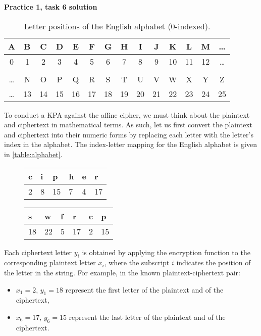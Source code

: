 \documentclass{practice}
\begin{document}
\begin{center}
  \textbf{Practice 1, task 6 solution}
\end{center}

\begin{table}[h!]
  \centering
  \begin{tabular}{@{}cccccccccccccc@{}}
    A  & B  & C  & D  & E  & F  & G  & H  & I  & J  & K  & L  & M & \dots\\\midrule
    0  & 1  & 2  & 3  & 4  & 5  & 6  & 7  & 8  & 9  & 10 & 11 & 12 & \dots\\\\
    \dots & N  & O  & P  & Q  & R  & S  & T  & U  & V  & W  & X  & Y  & Z\\\midrule
    \dots & 13 & 14 & 15 & 16 & 17 & 18 & 19 & 20 & 21 & 22 & 23 & 24 & 25
  \end{tabular}
  \caption{Letter positions of the English alphabet (0-indexed).}
  \label{table:alphabet}
\end{table}

To conduct a KPA against the affine cipher, we must think about the plaintext and ciphertext in mathematical terms.
As such, let us first convert the plaintext and ciphertext into their numeric forms by replacing each letter with the letter's index in the alphabet.
The index-letter mapping for the English alphabet is given in \autoref{table:alphabet}.

\begin{figure}[h!]
  \centering
  \begin{tabular}{@{}C{1em}C{1em}C{1em}C{1em}C{1em}C{1em}@{}}
    c & i & p & h & e & r\\ & 8 & 15 & 7 & 4 & 17
  \end{tabular}
  \hspace*{1cm}
  \begin{tabular}{@{}C{1em}C{1em}C{1em}C{1em}C{1em}C{1em}@{}}
    s & w & f & r & c & p\\ & 22 & 5 & 17 & 2 & 15
  \end{tabular}
\end{figure}

Each ciphertext letter $y_i$ is obtained by applying the encryption function to the corresponding plaintext letter $x_i$, where the subscript $i$ indicates the position of the letter in the string.
For example, in the known plaintext-ciphertext pair:
\begin{itemize}
  \item $x_1 = 2$, $y_1 = 18$ represent the first letter of the plaintext and of the ciphertext,
  \item $x_6 = 17$, $y_6 = 15$ represent the last letter of the plaintext and of the ciphertext.
\end{itemize}
\end{document}
